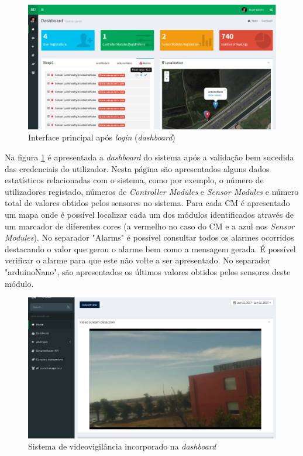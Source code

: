 \begin{figure}[h]
	\centering
	\includegraphics[width=0.9\linewidth]{prints-web/dashboard1.png}
	\caption{Interface principal após \textit{login} (\textit{dashboard})}
	\label{ddashboard}
\end{figure}



Na figura \ref{ddashboard} é apresentada a \textit{dashboard} do sistema após a validação bem sucedida das credenciais do utilizador. Nesta página são apresentados alguns dados estatísticos relacionadas com o sistema, como por exemplo, o número de utilizadores registado, números de \textit{Controller Modules} e \textit{Sensor Modules} e número total de valores obtidos pelos sensores no sistema. Para cada \acl{CM} é apresentado um mapa onde é possível localizar cada um dos módulos identificados através de um marcador de diferentes cores (a vermelho no caso do \acl{CM} e a azul nos \textit{Sensor Modules}). No separador "Alarms" é possível consultar todos os alarmes ocorridos destacando o valor que gerou o alarme bem como a mensagem gerada. É possível verificar o alarme para que este não volte a ser apresentado. No separador "arduinoNano", são apresentados os últimos valores obtidos pelos sensores deste módulo. 


\begin{figure}[h]
	\centering
	\includegraphics[width=0.7\linewidth]{prints-web/stream.png}
	\caption{Sistema de videovigilância incorporado na \textit{dashboard}}
	\label{vigilancia}
\end{figure}







